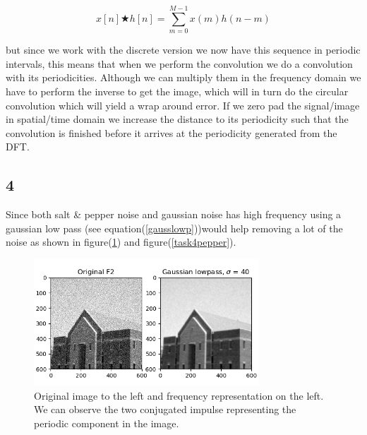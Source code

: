{\begin{equation}
    x[n] \bigstar h[n] = \sum_{m = 0}^{M-1} x(m)h(n - m)
    \label{discconv}
\end{equation}

but since we work with the discrete version we now have this sequence in periodic intervals, this means that when we perform the convolution we do a convolution with its periodicities. Although we can multiply them in the frequency domain we have to perform the inverse to get the image, which will in turn do the circular convolution which will yield a wrap around error. If we zero pad the signal/image in spatial/time domain we increase the distance to its periodicity such that the convolution is finished before it arrives at the periodicity generated from the DFT.


\subsection{4}

Since both salt \& pepper noise and gaussian noise has high frequency using a gaussian low pass (see equation(\ref{gausslowp}))would help removing a lot of the noise as shown in figure(\ref{task4gauss}) and figure(\ref{task4pepper}).

\begin{figure}[!htb]
    {\centering
        \includegraphics[width=0.75\textwidth]{task4gauss.png}
        \caption{Original image to the left and frequency representation on the left. We can observe the two conjugated impulse representing the periodic component in the image.}
        \label{task4gauss}
    \par}
    \end{figure}



}
